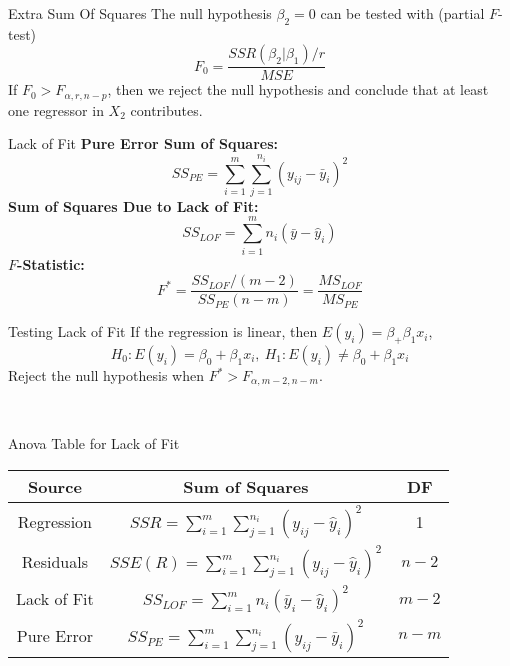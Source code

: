 \documentclass{article}
\begin{document}
\begin{multicols*}{3}
\begin{blackbox}{Extra Sum Of Squares}
        The null hypothesis $\beta_2=0$ can be tested with (partial $F$-test)\\[-4ex]
        \[F_0 = \frac{SSR(\beta_2|\beta_1)/r}{MSE}\]
        If $F_0 > F_{\alpha, r, n-p}$, then we reject the null hypothesis and conclude that at least one regressor in $X_2$ contributes.\\
    \end{blackbox}
    \begin{blackbox}{Lack of Fit}
        \textbf{Pure Error Sum of Squares:}\\[-2ex]
        \[SS_{PE} = \sum_{i=1}^m\sum_{j=1}^{n_i}(y_{ij} - \bar{y}_i)^2\]
        \textbf{Sum of Squares Due to Lack of Fit:}\\[-2ex]
        \[SS_{LOF} = \sum_{i=1}^m n_i(\bar{y} - \hat{y}_i)\]
        \textbf{$F$-Statistic:}\\[-2ex]
        \[F^* = \frac{SS_{LOF}/(m-2)}{SS_{PE}(n-m)} = \frac{MS_{LOF}}{MS_{PE}}\]
        \begin{bluebox}{Testing Lack of Fit}
            If the regression is linear, then $E(y_i) = \beta_ + \beta_1x_i$, \\[-1ex]
            \[H_0: E(y_i) = \beta_0 + \beta_1x_i, \ H_1: E(y_i) \neq \beta_0 + \beta_1x_i\]
            Reject the null hypothesis when $F^* > F_{\alpha, m-2, n-m}$.
        \end{bluebox}\\[-2ex]
    \end{blackbox}
    \renewcommand{\arraystretch}{1.5}
    \begin{blackbox}{Anova Table for Lack of Fit}
        \begin{center}
            \begin{tabular}{|c|c|c|}
                \hline
                Source & Sum of Squares & DF\\
                \hline 
                \hline 
                Regression & $SSR = \sum\limits_{i=1}^m\sum\limits_{j=1}^{n_i} (y_{ij} - \hat{y}_i)^2$ & 1\\
                \hline
                Residuals & $SSE(R) = \sum\limits_{i=1}^m\sum\limits_{j=1}^{n_i}(y_{ij} - \hat{y}_i)^2$ & $n-2$ \\
                \hline
                Lack of Fit & $SS_{LOF} = \sum\limits_{i=1}^m n_i(\bar{y}_i - \hat{y}_i)^2$ & $m-2$ \\
                \hline
                Pure Error & $SS_{PE} = \sum\limits_{i=1}^m\sum\limits_{j=1}^{n_i} (y_{ij}-\bar{y}_i)^2$ & $n-m$ \\

\end{tabular}
\end{center}
\end{blackbox}
\end{multicols*}
\end{document}
